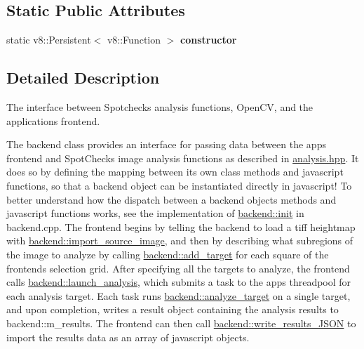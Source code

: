 \subsection*{Static Public Attributes}
\begin{DoxyCompactItemize}
\item 
\mbox{\label{classbackend_a2e36e089be85fa5fcdec6d9ab50c3199}} 
static v8\+::\+Persistent$<$ v8\+::\+Function $>$ {\bfseries constructor}
\end{DoxyCompactItemize}


\subsection{Detailed Description}
The interface between Spotcheck\textquotesingle{}s analysis functions, Open\+CV, and the application\textquotesingle{}s frontend. 

The backend class provides an interface for passing data between the app\textquotesingle{}s frontend and Spot\+Check\textquotesingle{}s image analysis functions as described in \hyperlink{analysis_8hpp}{analysis.\+hpp}. It does so by defining the mapping between it\textquotesingle{}s own class methods and javascript functions, so that a backend object can be instantiated directly in javascript! To better understand how the dispatch between a backend object\textquotesingle{}s methods and javascript functions works, see the implementation of \hyperlink{classbackend_a44ff4b919d81243742ff4b4bedde4f83}{backend\+::init} in backend.\+cpp. The frontend begins by telling the backend to load a tiff heightmap with \hyperlink{classbackend_a516007959f2bc8b4f5f83d1a448a6090}{backend\+::import\+\_\+source\+\_\+image}, and then by describing what subregions of the image to analyze by calling \hyperlink{classbackend_ac981fabc3077c133dca35b5cb7e6f66c}{backend\+::add\+\_\+target} for each square of the frontend\textquotesingle{}s selection grid. After specifying all the targets to analyze, the frontend calls \hyperlink{classbackend_adea4e670e5c1e84d295c5cd03deceb4a}{backend\+::launch\+\_\+analysis}, which submits a task to the app\textquotesingle{}s threadpool for each analysis target. Each task runs \hyperlink{classbackend_a23963a7c7e73bba71cbf77e27224efd8}{backend\+::analyze\+\_\+target} on a single target, and upon completion, writes a result object containing the analysis results to backend\+::m\+\_\+results. The frontend can then call \hyperlink{classbackend_a91fe1ff0bbdc9e29d6958e0cf72d10ba}{backend\+::write\+\_\+results\+\_\+\+J\+S\+ON} to import the results data as an array of javascript objects. 

